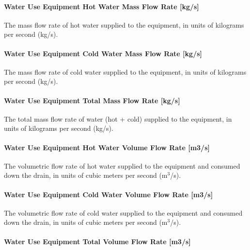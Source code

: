 \paragraph{Water Use Equipment Hot Water Mass Flow Rate {[}kg/s{]}}\label{water-use-equipment-hot-water-mass-flow-rate-kgs}

The mass flow rate of hot water supplied to the equipment, in units of kilograms per second (kg/s).

\paragraph{Water Use Equipment Cold Water Mass Flow Rate {[}kg/s{]}}\label{water-use-equipment-cold-water-mass-flow-rate-kgs}

The mass flow rate of cold water supplied to the equipment, in units of kilograms per second (kg/s).

\paragraph{Water Use Equipment Total Mass Flow Rate {[}kg/s{]}}\label{water-use-equipment-total-mass-flow-rate-kgs}

The total mass flow rate of water (hot + cold) supplied to the equipment, in units of kilograms per second (kg/s).

\paragraph{Water Use Equipment Hot Water Volume Flow Rate {[}m3/s{]}}\label{water-use-equipment-hot-water-volume-flow-rate-m3s}

The volumetric flow rate of hot water supplied to the equipment and consumed down the drain, in units of cubic meters per second (m\(^{3}\)/s).

\paragraph{Water Use Equipment Cold Water Volume Flow Rate {[}m3/s{]}}\label{water-use-equipment-cold-water-volume-flow-rate-m3s}

The volumetric flow rate of cold water supplied to the equipment and consumed down the drain, in units of cubic meters per second (m\(^{3}\)/s).

\paragraph{Water Use Equipment Total Volume Flow Rate {[}m3/s{]}}\label{water-use-equipment-total-volume-flow-rate-m3s}

